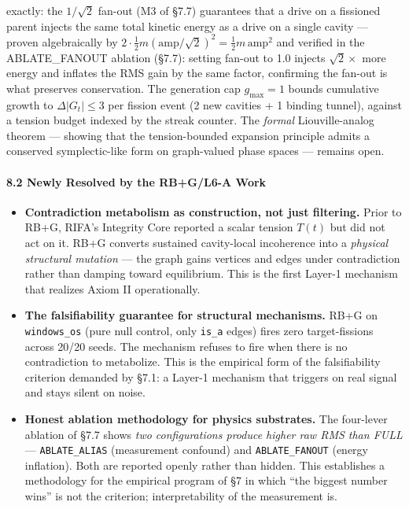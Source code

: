 \documentclass[
  11pt,
  a4paper,
]{article}
\begin{document}
\begin{itemize}
  exactly: the \(1/\sqrt{2}\) fan-out (M3 of §7.7) guarantees that a
  drive on a fissioned parent injects the same total kinetic energy as a
  drive on a single cavity --- proven algebraically by
  \(2 \cdot \frac{1}{2} m (\text{amp}/\sqrt{2})^2 = \frac{1}{2} m \, \text{amp}^2\)
  and verified in the ABLATE\_FANOUT ablation (§7.7): setting fan-out to
  1.0 injects \(\sqrt{2}\times\) more energy and inflates the RMS gain
  by the same factor, confirming the fan-out is what preserves
  conservation. The generation cap \(g_\text{max} = 1\) bounds
  cumulative growth to \(\Delta|G_t| \leq 3\) per fission event (2 new
  cavities + 1 binding tunnel), against a tension budget indexed by the
  streak counter. The \emph{formal} Liouville-analog theorem --- showing
  that the tension-bounded expansion principle admits a conserved
  symplectic-like form on graph-valued phase spaces --- remains open.
\end{itemize}

\paragraph{8.2 Newly Resolved by the RB+G/L6-A
Work}\label{newly-resolved-by-the-rbgl6-a-work}

\begin{itemize}
\item
  \textbf{Contradiction metabolism as construction, not just filtering.}
  Prior to RB+G, RIFA's Integrity Core reported a scalar tension
  \(T(t)\) but did not act on it. RB+G converts sustained cavity-local
  incoherence into a \emph{physical structural mutation} --- the graph
  gains vertices and edges under contradiction rather than damping
  toward equilibrium. This is the first Layer-1 mechanism that realizes
  Axiom II operationally.
\item
  \textbf{The falsifiability guarantee for structural mechanisms.} RB+G
  on \texttt{windows\_os} (pure null control, only \texttt{is\_a} edges)
  fires zero target-fissions across 20/20 seeds. The mechanism refuses
  to fire when there is no contradiction to metabolize. This is the
  empirical form of the falsifiability criterion demanded by §7.1: a
  Layer-1 mechanism that triggers on real signal and stays silent on
  noise.
\item
  \textbf{Honest ablation methodology for physics substrates.} The
  four-lever ablation of §7.7 shows \emph{two configurations produce
  higher raw RMS than FULL} --- \texttt{ABLATE\_ALIAS} (measurement
  confound) and \texttt{ABLATE\_FANOUT} (energy inflation). Both are
  reported openly rather than hidden. This establishes a methodology for
  the empirical program of §7 in which ``the biggest number wins'' is
  not the criterion; interpretability of the measurement is.
\end{itemize}
\end{document}
